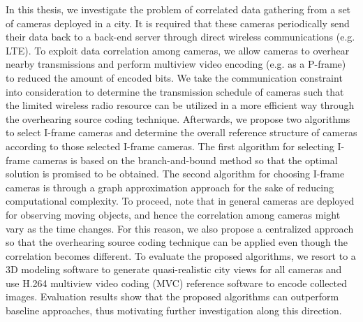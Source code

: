 In this thesis, we investigate the problem of correlated data gathering from a set of cameras deployed in a city.
It is required that these cameras periodically send their data back to a back-end server through direct wireless communications (e.g. LTE).
To exploit data correlation among cameras, we allow cameras to overhear nearby transmissions and perform multiview video encoding (e.g. as a P-frame) to reduced the amount of encoded bits.
We take the communication constraint into consideration to determine the transmission schedule of cameras such that the limited wireless radio resource can be utilized in a more efficient way through the overhearing source coding technique.
Afterwards, we propose two algorithms to select I-frame cameras and determine the overall reference structure of cameras according to those selected I-frame cameras.
The first algorithm for selecting I-frame cameras is based on the branch-and-bound method so that the optimal solution is promised to be obtained.
The second algorithm for choosing I-frame cameras is through a graph approximation approach for the sake of reducing computational complexity.
To proceed, note that in general cameras are deployed for observing moving objects, and hence the correlation among cameras might vary as the time changes.
For this reason, we also propose a centralized approach so that the overhearing source coding technique can be applied even though the correlation becomes different.
To evaluate the proposed algorithms, we resort to a 3D modeling software to generate quasi-realistic city views for all cameras and use H.264 multiview video coding (MVC) reference software to encode collected images.
Evaluation results show that the proposed algorithms can outperform baseline approaches, thus motivating further investigation along this direction.

